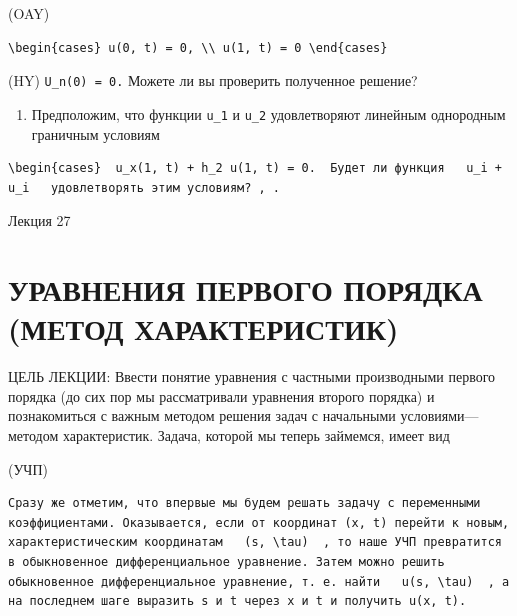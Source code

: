 \documentclass[
  ukrainian,
]{article}
\providecommand{\tightlist}{%
  \setlength{\itemsep}{0pt}\setlength{\parskip}{0pt}}
\begin{document}
(OAY)

\begin{verbatim}
\begin{cases} u(0, t) = 0, \\ u(1, t) = 0 \end{cases}
\end{verbatim}

(HY) \texttt{U\_n(0)\ =\ 0.} Можете ли вы проверить полученное решение?

\begin{enumerate}
\def\labelenumi{\arabic{enumi}.}
\setcounter{enumi}{5}
\tightlist
\item
  Предположим, что функции \texttt{u\_1} и \texttt{u\_2} удовлетворяют
  линейным однородным граничным условиям
\end{enumerate}

\begin{verbatim}
\begin{cases}  u_x(1, t) + h_2 u(1, t) = 0.  Будет ли функция   u_i + u_i   удовлетворять этим условиям? , .
\end{verbatim}

Лекция 27

\section{УРАВНЕНИЯ ПЕРВОГО ПОРЯДКА (МЕТОД
ХАРАКТЕРИСТИК)}\label{ux443ux440ux430ux432ux43dux435ux43dux438ux44f-ux43fux435ux440ux432ux43eux433ux43e-ux43fux43eux440ux44fux434ux43aux430-ux43cux435ux442ux43eux434-ux445ux430ux440ux430ux43aux442ux435ux440ux438ux441ux442ux438ux43a}

ЦЕЛЬ ЛЕКЦИИ: Ввести понятие уравнения с частными производными первого
порядка (до сих пор мы рассматривали уравнения второго порядка) и
познакомиться с важным методом решения задач с начальными
условиями---методом характеристик. Задача, которой мы теперь займемся,
имеет вид

(УЧП)

\begin{verbatim}
Сразу же отметим, что впервые мы будем решать задачу с переменными коэффициентами. Оказывается, если от координат (x, t) перейти к новым, характеристическим координатам   (s, \tau)  , то наше УЧП превратится в обыкновенное дифференциальное уравнение. Затем можно решить обыкновенное дифференциальное уравнение, т. е. найти   u(s, \tau)  , а на последнем шаге выразить s и t через x и t и получить u(x, t).
\end{verbatim}
\end{document}
